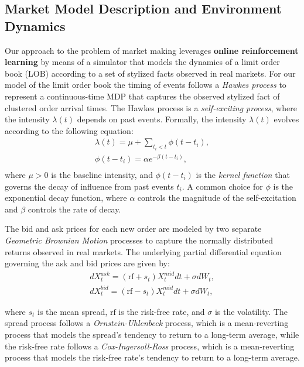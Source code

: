 \subsection{Market Model Description and Environment Dynamics}
\label{subsec:market-model-description-and-environment-dynamics}
Our approach to the problem of market making leverages \textbf{online reinforcement learning} by means of a simulator that models the dynamics of
a limit order book (LOB) according to a set of stylized facts observed in real markets.
For our model of the limit order book the timing of events follows a \textit{Hawkes process}
to represent a continuous-time MDP that captures the observed stylized fact of clustered order arrival times.
The Hawkes process is a \textit{self-exciting process}, where the intensity \( \lambda(t) \) depends on past events.
Formally, the intensity \( \lambda(t) \) evolves according to the following equation:
\begin{gather*}
    \lambda(t) = \mu + \sum_{t_i < t} \phi(t - t_i),\\
    \phi(t - t_i) = \alpha e^{-\beta (t - t_i)},\\
\end{gather*}
where \( \mu > 0 \) is the baseline intensity, and \( \phi(t - t_i) \) is the \textit{kernel function} that governs the decay of influence from past events \( t_i \).
A common choice for \( \phi \) is the exponential decay function, where \(\alpha\) controls the magnitude of the self-excitation and \(\beta\) controls the rate of decay.
\newline

The bid and ask prices for each new order are modeled by two separate \textit{Geometric Brownian Motion} processes to capture the normally distributed returns observed in real markets.
The underlying partial differential equation governing the ask and bid prices are given by:
\begin{gather*}
    dX_{t}^{ask} = (\text{rf} + s_t) X_{t}^{mid} dt + \sigma dW_t,\\
    dX_{t}^{bid} = (\text{rf} - s_t) X_{t}^{mid} dt + \sigma dW_t,
\end{gather*}

where $s_t$ is the mean spread, $\text{rf}$ is the risk-free rate, and $\sigma$ is the volatility.
The spread process follows a \textit{Ornstein-Uhlenbeck} process, which is a mean-reverting process that models the spread's tendency to return to a long-term average,
while the risk-free rate follows a \textit{Cox-Ingersoll-Ross} process, which is a mean-reverting process that models the risk-free rate's tendency to return to a long-term average.

